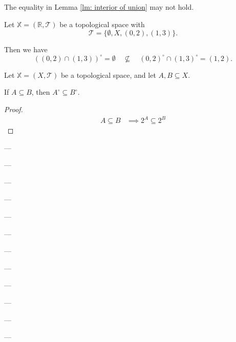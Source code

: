 \begin{note}
	The equality in Lemma \ref{lm: interior of union} may not hold.
	
	Let $\mathbb X = (\mathbb R, \mathcal T)$ be a topological space with
	$$
	\mathcal T = \{\emptyset, X, (0,2), (1,3)\}.
	$$
	
	Then we have
	$$
	((0,2) \cap (1,3))^\circ = \emptyset \quad \not \subseteq \quad (0, 2)^\circ \cap (1, 3)^\circ = (1,2).
	$$
\end{note}


\begin{lemma}
	Let $\mathbb X = (X, \mathcal T)$ be a topological space, and let $A, B \subseteq X$.
	
	If $A \subseteq B$, then $A^\circ \subseteq B^\circ$.
	
	\begin{proof}
		$$
		\begin{aligned}
			A \subseteq B &\implies 2^A \subseteq 2^B
		\end{aligned}
		$$
	\end{proof}
\end{lemma}





---

---

---

---

---

---

---

---

---

---

---

---















































%